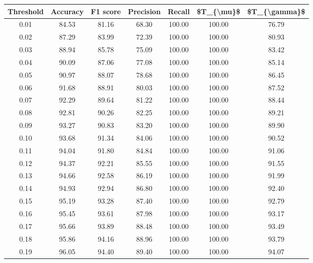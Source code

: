 \begin{tabular}{|c|c|c|c|c|c|c|}
\hline
 Threshold &  Accuracy &  F1 score &  Precision &  Recall &  \$T\_\{\textbackslash mu\}\$ &  \$T\_\{\textbackslash gamma\}\$ \\
\hline
      0.01 &     84.53 &     81.16 &      68.30 &  100.00 &     100.00 &         76.79 \\
      0.02 &     87.29 &     83.99 &      72.39 &  100.00 &     100.00 &         80.93 \\
      0.03 &     88.94 &     85.78 &      75.09 &  100.00 &     100.00 &         83.42 \\
      0.04 &     90.09 &     87.06 &      77.08 &  100.00 &     100.00 &         85.14 \\
      0.05 &     90.97 &     88.07 &      78.68 &  100.00 &     100.00 &         86.45 \\
      0.06 &     91.68 &     88.91 &      80.03 &  100.00 &     100.00 &         87.52 \\
      0.07 &     92.29 &     89.64 &      81.22 &  100.00 &     100.00 &         88.44 \\
      0.08 &     92.81 &     90.26 &      82.25 &  100.00 &     100.00 &         89.21 \\
      0.09 &     93.27 &     90.83 &      83.20 &  100.00 &     100.00 &         89.90 \\
      0.10 &     93.68 &     91.34 &      84.06 &  100.00 &     100.00 &         90.52 \\
      0.11 &     94.04 &     91.80 &      84.84 &  100.00 &     100.00 &         91.06 \\
      0.12 &     94.37 &     92.21 &      85.55 &  100.00 &     100.00 &         91.55 \\
      0.13 &     94.66 &     92.58 &      86.19 &  100.00 &     100.00 &         91.99 \\
      0.14 &     94.93 &     92.94 &      86.80 &  100.00 &     100.00 &         92.40 \\
      0.15 &     95.19 &     93.28 &      87.40 &  100.00 &     100.00 &         92.79 \\
      0.16 &     95.45 &     93.61 &      87.98 &  100.00 &     100.00 &         93.17 \\
      0.17 &     95.66 &     93.89 &      88.48 &  100.00 &     100.00 &         93.49 \\
      0.18 &     95.86 &     94.16 &      88.96 &  100.00 &     100.00 &         93.79 \\
      0.19 &     96.05 &     94.40 &      89.40 &  100.00 &     100.00 &         94.07 \\

\end{tabular}
